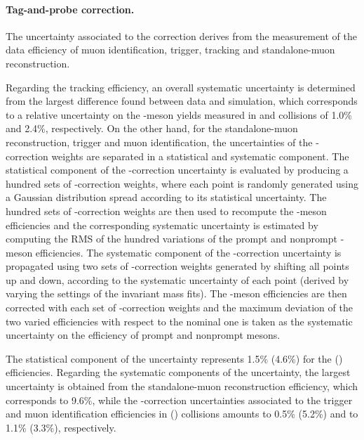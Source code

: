 \paragraph{Tag-and-probe correction.} The uncertainty associated to the \tnp correction derives from the measurement of the \tnp data efficiency of muon identification, trigger, tracking and standalone-muon reconstruction.

Regarding the tracking efficiency, an overall systematic uncertainty is determined from the largest difference found between data and simulation, which corresponds to a relative uncertainty on the \JPsi-meson yields measured in \Runpp and \RunPbPb collisions of 1.0\% and 2.4\%, respectively. On the other hand, for the standalone-muon reconstruction, trigger and muon identification, the uncertainties of the \tnp-correction weights are separated in a statistical and systematic component. The statistical component of the \tnp-correction uncertainty is evaluated by producing a hundred sets of \tnp-correction weights, where each point is randomly generated using a Gaussian distribution spread according to its statistical uncertainty. The hundred sets of \tnp-correction weights are then used to recompute the \JPsi-meson efficiencies and the corresponding systematic uncertainty is estimated by computing the RMS of the hundred variations of the prompt and nonprompt \JPsi-meson efficiencies. The systematic component of the \tnp-correction uncertainty is propagated using two sets of \tnp-correction weights generated by shifting all points up and down, according to the systematic uncertainty of each point (derived by varying the settings of the \tnp invariant mass fits). The \JPsi-meson efficiencies are then corrected with each set of \tnp-correction  weights and the maximum deviation of the two varied efficiencies with respect to the nominal one is taken as the systematic uncertainty on the efficiency of prompt and nonprompt \JPsi mesons.

The statistical component of the \tnp uncertainty represents 1.5\% (4.6\%) for the \Runpp (\RunPbPb) efficiencies. Regarding the systematic components of the \tnp uncertainty, the largest uncertainty is obtained from the standalone-muon reconstruction efficiency, which corresponds to 9.6\%, while the \tnp-correction uncertainties associated to the trigger and muon identification efficiencies in \Runpp (\RunPbPb) collisions amounts to 0.5\% (5.2\%) and to 1.1\% (3.3\%), respectively.

